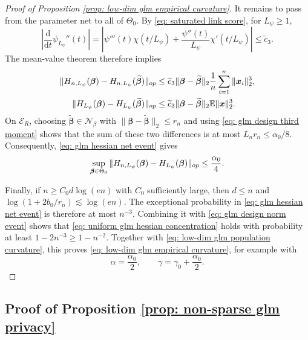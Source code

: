 \documentclass[letterpaper,12pt]{article}
\renewcommand{\d}{\mathrm{d}}
\numberwithin{equation}{section}
\theoremstyle{plain}
\numberwithin{Theorem}{section}
\numberwithin{proposition}{section}
\numberwithin{Lemma}{section}
{
	\theoremstyle{definition}
	\newtheorem{Definition}{Definition}
	\newtheorem{example}{Example}
	\numberwithin{example}{section}
	\newtheorem{fact}{Fact}
	\numberwithin{fact}{section}
	\newtheorem{remark}{Remark}
}
\newcommand{\1}{\mathbbm{1}}
\def\bbeta{{\boldsymbol{\beta}}}
\def\E{\mathbb{E}}
\begin{document}
\begin{proof}[Proof of Proposition \ref{prop: low-dim glm empirical curvature}]
	It remains to pass from the parameter net to all of $\Theta_0$.
	By \eqref{eq: saturated link score}, for $L_\psi\geq1$,
	\[
		\left|\frac{\d}{\d t}\psi_{L_\psi}''(t)\right|
		=\left|\psi'''(t)\chi(t/L_\psi)
		+\frac{\psi''(t)}{L_\psi}\chi'(t/L_\psi)\right|
		\leq\widetilde c_3.
	\]
	The mean-value theorem therefore implies
	\begin{align*}
	\|H_{n,L_\psi}(\bbeta)-H_{n,L_\psi}(\widetilde\bbeta)\|_{\rm op}
	&\leq \widetilde c_3\|\bbeta-\widetilde\bbeta\|_2
	\frac1n\sum_{i=1}^n\|\bm x_i\|_2^3,\\
	\|H_{L_\psi}(\bbeta)-H_{L_\psi}(\widetilde\bbeta)\|_{\rm op}
	&\leq \widetilde c_3\|\bbeta-\widetilde\bbeta\|_2\E\|\bm x\|_2^3.
	\end{align*}
	On $\mathcal E_R$, choosing $\widetilde\bbeta\in\mathcal N_\beta$ with
	$\|\bbeta-\widetilde\bbeta\|_2\leq r_n$ and using \eqref{eq: glm design third moment} shows that the sum of these two differences is at most
	$L_nr_n\leq\alpha_0/8$.  Consequently, \eqref{eq: glm hessian net event} gives
	\begin{equation}\label{eq: uniform glm hessian concentration}
	\sup_{\bbeta\in\Theta_0}
	\|H_{n,L_\psi}(\bbeta)-H_{L_\psi}(\bbeta)\|_{\rm op}
	\leq\frac{\alpha_0}{4}.
	\end{equation}

	Finally, if $n\geq C_0d\log(en)$ with $C_0$ sufficiently large, then $d\leq n$ and
	$\log(1+2b_0/r_n)\lesssim\log(en)$.  The exceptional probability in \eqref{eq: glm hessian net event} is therefore at most $n^{-3}$.  Combining it with \eqref{eq: glm design norm event} shows that \eqref{eq: uniform glm hessian concentration} holds with probability at least $1-2n^{-3}\geq1-n^{-2}$.  Together with \eqref{eq: low-dim glm population curvature}, this proves \eqref{eq: low-dim glm empirical curvature}, for example with
	\[
	\alpha=\frac{\alpha_0}{2},
	\qquad
	\gamma=\gamma_0+\frac{\alpha_0}{2}.
	\]
\end{proof}

\subsection{Proof of Proposition \ref{prop: non-sparse glm privacy}}\label{sec: proof of prop: non-sparse glm privacy}
\end{document}
